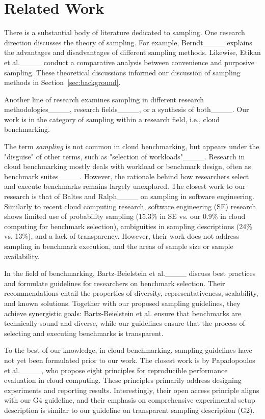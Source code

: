 \section{Related Work}
\label{sec:related_work}




There is a substantial body of literature dedicated to sampling. One research direction discusses the theory of sampling. For example, Berndt____ explains the advantages and disadvantages of different sampling methods. Likewise, Etikan et al.____ conduct a comparative analysis between convenience and purposive sampling. These theoretical discussions informed our discussion of sampling methods in Section~\ref{sec:background}.

Another line of research examines sampling in different research methodologies____, research fields____, or a synthesis of both____. Our work is in the category of sampling within a research field, i.e., cloud benchmarking.

The term \textit{sampling} is not common in cloud benchmarking, but appears under the "disguise" of other terms, such as "selection of workloads"____. Research in cloud benchmarking mostly deals with workload or benchmark design, often as benchmark suites____. However, the rationale behind how researchers select and execute benchmarks remains largely unexplored.
The closest work to our research is that of Baltes and Ralph____ on sampling in software engineering. Similarly to recent cloud computing research, software engineering (SE) research shows limited use of probability sampling (15.3\% in SE vs. our 0.9\% in cloud computing for benchmark selection), ambiguities in sampling descriptions (24\% vs. 13\%), and a lack of transparency. However, their work does not address sampling in benchmark execution, and the areas of sample size or sample availability.

In the field of benchmarking, Bartz-Beielstein et al.____ discuss best practices and formulate guidelines for researchers on benchmark selection. Their recommendations entail the properties of diversity, representativeness, scalability, and known solutions. Together with our proposed sampling guidelines, they achieve synergistic goals: Bartz-Beielstein et al. ensure that benchmarks are technically sound and diverse, while our guidelines ensure that the process of selecting and executing benchmarks is transparent.

To the best of our knowledge, in cloud benchmarking, sampling guidelines have not yet been formulated prior to our work. The closest work is by Papadopoulos et al.____, who propose eight principles for reproducible performance evaluation in cloud computing. These principles primarily address designing experiments and reporting results. Interestingly, their open access principle aligns with our G4 guideline, and their emphasis on comprehensive experimental setup description is similar to our guideline on transparent sampling description (G2).